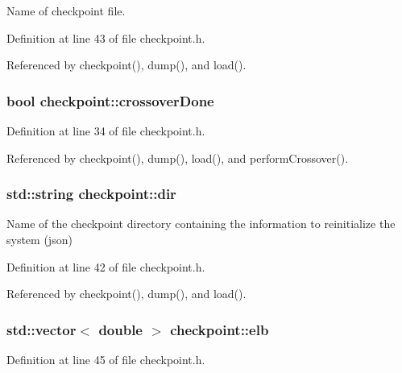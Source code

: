 Name of checkpoint file. 



Definition at line 43 of file checkpoint.\-h.



Referenced by checkpoint(), dump(), and load().

\hypertarget{classcheckpoint_a4f13612ea6d376bb327295bfce3a70c5}{
\subsubsection[{crossover\-Done}]{\setlength{\rightskip}{0pt plus 5cm}bool checkpoint\-::crossover\-Done}}\label{classcheckpoint_a4f13612ea6d376bb327295bfce3a70c5}


Definition at line 34 of file checkpoint.\-h.



Referenced by checkpoint(), dump(), load(), and perform\-Crossover().

\hypertarget{classcheckpoint_a0e0f999ee8e0b09541e9131baa8a591d}{
\subsubsection[{dir}]{\setlength{\rightskip}{0pt plus 5cm}std\-::string checkpoint\-::dir}}\label{classcheckpoint_a0e0f999ee8e0b09541e9131baa8a591d}


Name of the checkpoint directory containing the information to reinitialize the system (json) 



Definition at line 42 of file checkpoint.\-h.



Referenced by checkpoint(), dump(), and load().

\hypertarget{classcheckpoint_a2338cb624f19eb6776c10f9bb83b2a5d}{
\subsubsection[{elb}]{\setlength{\rightskip}{0pt plus 5cm}std\-::vector$<$ double $>$ checkpoint\-::elb}}\label{classcheckpoint_a2338cb624f19eb6776c10f9bb83b2a5d}


Definition at line 45 of file checkpoint.\-h.



